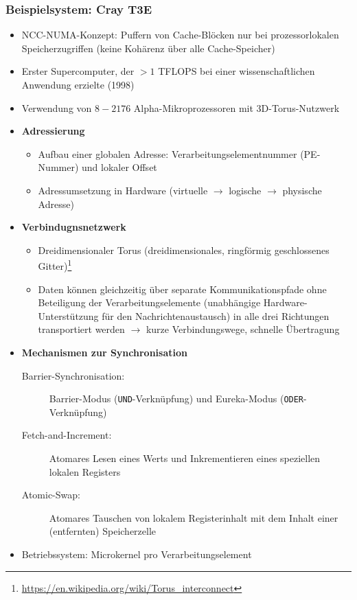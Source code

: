 \subsubsection{Beispielsystem: Cray T3E}
\begin{itemize}
	\item NCC-NUMA-Konzept: Puffern von Cache-Blöcken nur bei prozessorlokalen Speicherzugriffen (keine Kohärenz über alle Cache-Speicher)
	\item Erster Supercomputer, der \(>1\) TFLOPS bei einer wissenschaftlichen Anwendung erzielte (1998)
	\item Verwendung von \(8-2176\) Alpha-Mikroprozessoren mit 3D-Torus-Nutzwerk
	\item \textbf{Adressierung}
	\begin{itemize}
		\item Aufbau einer globalen Adresse: Verarbeitungselementnummer (PE-Nummer) und lokaler Offset
		\item Adressumsetzung in Hardware (virtuelle \(\rightarrow\) logische \(\rightarrow\) physische Adresse)
	\end{itemize}
	\item \textbf{Verbindugnsnetzwerk}
	\begin{itemize}
		\item Dreidimensionaler Torus (dreidimensionales, ringförmig geschlossenes Gitter)\footnote{\url{https://en.wikipedia.org/wiki/Torus_interconnect}}
		\item Daten können gleichzeitig über separate Kommunikationspfade ohne Beteiligung der Verarbeitungselemente (unabhängige Hardware-Unterstützung für den Nachrichtenaustausch) in alle drei Richtungen transportiert werden \(\rightarrow\) kurze Verbindungswege, schnelle Übertragung
	\end{itemize}
	\item \textbf{Mechanismen zur Synchronisation}
	\begin{description}
		\item[Barrier-Synchronisation:] Barrier-Modus (\texttt{UND}-Verknüpfung) und Eureka-Modus (\texttt{ODER}-Verknüpfung)
		\item[Fetch-and-Increment:] Atomares Lesen eines Werts und Inkrementieren eines speziellen lokalen Registers
		\item[Atomic-Swap:] Atomares Tauschen von lokalem Registerinhalt mit dem Inhalt einer (entfernten) Speicherzelle
	\end{description}
	\item Betriebssystem: Microkernel pro Verarbeitungselement
\end{itemize}

